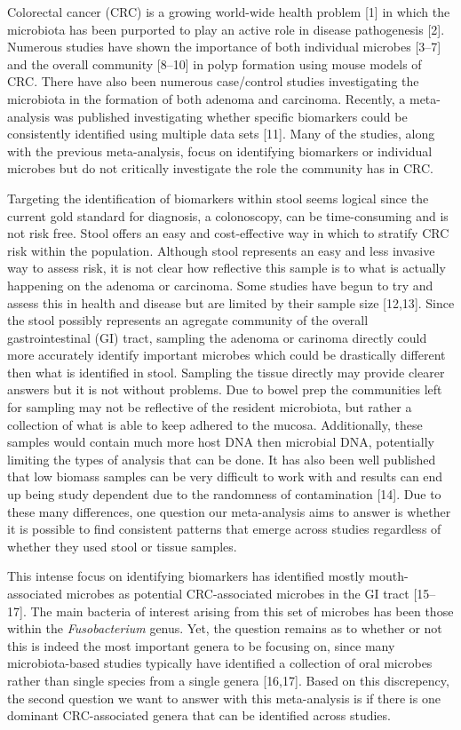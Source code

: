 \documentclass[12pt,]{article}
\begin{document}
Colorectal cancer (CRC) is a growing world-wide health problem {[}1{]}
in which the microbiota has been purported to play an active role in
disease pathogenesis {[}2{]}. Numerous studies have shown the importance
of both individual microbes {[}3--7{]} and the overall community
{[}8--10{]} in polyp formation using mouse models of CRC. There have
also been numerous case/control studies investigating the microbiota in
the formation of both adenoma and carcinoma. Recently, a meta-analysis
was published investigating whether specific biomarkers could be
consistently identified using multiple data sets {[}11{]}. Many of the
studies, along with the previous meta-analysis, focus on identifying
biomarkers or individual microbes but do not critically investigate the
role the community has in CRC.

Targeting the identification of biomarkers within stool seems logical
since the current gold standard for diagnosis, a colonoscopy, can be
time-consuming and is not risk free. Stool offers an easy and
cost-effective way in which to stratify CRC risk within the population.
Although stool represents an easy and less invasive way to assess risk,
it is not clear how reflective this sample is to what is actually
happening on the adenoma or carcinoma. Some studies have begun to try
and assess this in health and disease but are limited by their sample
size {[}12,13{]}. Since the stool possibly represents an agregate
community of the overall gastrointestinal (GI) tract, sampling the
adenoma or carinoma directly could more accurately identify important
microbes which could be drastically different then what is identified in
stool. Sampling the tissue directly may provide clearer answers but it
is not without problems. Due to bowel prep the communities left for
sampling may not be reflective of the resident microbiota, but rather a
collection of what is able to keep adhered to the mucosa. Additionally,
these samples would contain much more host DNA then microbial DNA,
potentially limiting the types of analysis that can be done. It has also
been well published that low biomass samples can be very difficult to
work with and results can end up being study dependent due to the
randomness of contamination {[}14{]}. Due to these many differences, one
question our meta-analysis aims to answer is whether it is possible to
find consistent patterns that emerge across studies regardless of
whether they used stool or tissue samples.

This intense focus on identifying biomarkers has identified mostly
mouth-associated microbes as potential CRC-associated microbes in the GI
tract {[}15--17{]}. The main bacteria of interest arising from this set
of microbes has been those within the \emph{Fusobacterium} genus. Yet,
the question remains as to whether or not this is indeed the most
important genera to be focusing on, since many microbiota-based studies
typically have identified a collection of oral microbes rather than
single species from a single genera {[}16,17{]}. Based on this
discrepency, the second question we want to answer with this
meta-analysis is if there is one dominant CRC-associated genera that can
be identified across studies.
\end{document}
